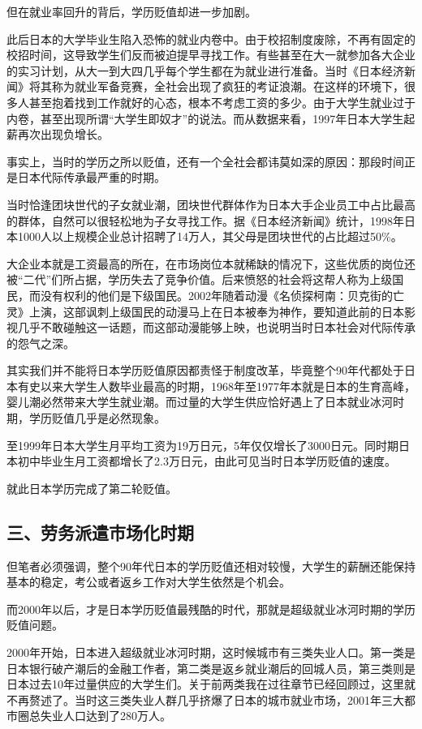 但在就业率回升的背后，学历贬值却进一步加剧。

此后日本的大学毕业生陷入恐怖的就业内卷中。由于校招制度废除，不再有固定的校招时间，这导致学生们反而被迫提早寻找工作。有些甚至在大一就参加各大企业的实习计划，从大一到大四几乎每个学生都在为就业进行准备。当时《日本经济新闻》将其称为就业军备竞赛，全社会出现了疯狂的考证浪潮。在这样的环境下，很多人甚至抱着找到工作就好的心态，根本不考虑工资的多少。由于大学生就业过于内卷，甚至出现所谓“大学生即奴才”的说法。而从数据来看，1997年日本大学生起薪再次出现负增长。

事实上，当时的学历之所以贬值，还有一个全社会都讳莫如深的原因：那段时间正是日本代际传承最严重的时期。

当时恰逢团块世代的子女就业潮，团块世代群体作为日本大手企业员工中占比最高的群体，自然可以很轻松地为子女寻找工作。据《日本经济新闻》统计，1998年日本1000人以上规模企业总计招聘了14万人，其父母是团块世代的占比超过50\%。

大企业本就是工资最高的所在，在市场岗位本就稀缺的情况下，这些优质的岗位还被“二代”们所占据，学历失去了竞争价值。后来愤怒的社会将这帮人称为上级国民，而没有权利的他们是下级国民。2002年随着动漫《名侦探柯南：贝克街的亡灵》上演，这部讽刺上级国民的动漫马上在日本被奉为神作，要知道此前的日本影视几乎不敢碰触这一话题，而这部动漫能够上映，也说明当时日本社会对代际传承的怨气之深。

其实我们并不能将日本学历贬值原因都责怪于制度改革，毕竟整个90年代都处于日本有史以来大学生人数毕业最高的时期，1968年至1977年本就是日本的生育高峰，婴儿潮必然带来大学生就业潮。而过量的大学生供应恰好遇上了日本就业冰河时期，学历贬值几乎是必然现象。

至1999年日本大学生月平均工资为19万日元，5年仅仅增长了3000日元。同时期日本初中毕业生月工资都增长了2.3万日元，由此可见当时日本学历贬值的速度。

就此日本学历完成了第二轮贬值。

\subsection{三、劳务派遣市场化时期}

但笔者必须强调，整个90年代日本的学历贬值还相对较慢，大学生的薪酬还能保持基本的稳定，考公或者返乡工作对大学生依然是个机会。

而2000年以后，才是日本学历贬值最残酷的时代，那就是超级就业冰河时期的学历贬值问题。

2000年开始，日本进入超级就业冰河时期，这时候城市有三类失业人口。第一类是日本银行破产潮后的金融工作者，第二类是返乡就业潮后的回城人员，第三类则是日本过去10年过量供应的大学生们。关于前两类我在过往章节已经回顾过，这里就不再赘述了。当时这三类失业人群几乎挤爆了日本的城市就业市场，2001年三大都市圈总失业人口达到了280万人。


